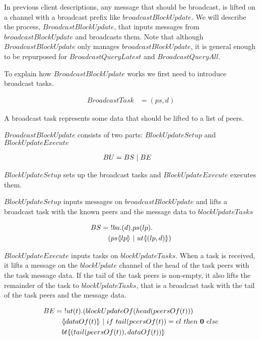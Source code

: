In previous client descriptions, any message that should be broadcast, is lifted on a channel with a broadcast prefix like $broadcastBlockUpdate$.
We will describe the process, $BroadcastBlockUpdate$, that inputs messages from $broadcastBlockUpdate$ and broadcasts them.
Note that although $BroadcastBlockUpdate$ only manages $broadcastBlockUpdate$, it is general enough to be repurposed for $BroadcastQueryLatest$ and $BroadcastQueryAll$.

To explain how $BroadcastBlockUpdate$ works we first need to introduce broadcast tasks.

\begin{align*}
    BroadcastTask &= (ps, d)
\end{align*}

A broadcast task represents some data that should be lifted to a list of peers.

$BroadcastBlockUpdate$ consists of two parts: $BlockUpdateSetup$ and $BlockUpdateExecute$

\begin{align*}
    BU &= BS \mid BE
\end{align*}

$BlockUpdateSetup$ sets up the broadcast tasks and $BlockUpdateExecute$ executes them.

$BlockUpdateSetup$ inputs messages on $broadcastBlockUpdate$ and lifts a broadcast task with the known peers and the message data to $blockUpdateTasks$

\begin{align*}
    BS &=\ !bu.(d).ps(lp).\\
    &\quad (ps \langle \! | lp | \! \rangle\ |\ ut \langle \! | (lp,d) | \! \rangle)
\end{align*}

$BlockUpdateExecute$ inputs tasks on $blockUpdateTasks$.
When a task is received, it lifts a message on the $blockUpdate$ channel of the head of the task peers with the task message data.
If the tail of the task peers is non-empty, it also lifts the remainder of the task to $blockUpdateTasks$, that is a broadcast task with the tail of the task peers and the message data.

\begin{align*}
    BE &=\ !ut(t).(blockUpdateOf(head(peersOf(t)))\\
    &\quad \lift{}{dataOf(t)}\ |\ if\ tail(peersOf(t))=el\ then\ \nil\ else\\
    &\quad bt\lift{}{(tail(peersOf(t)),dataOf(t))}
\end{align*}
